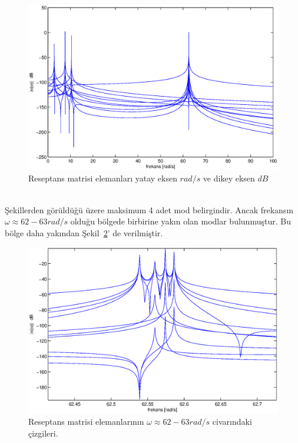 \documentclass[a4paper]{report}
\begin{document}
\begin{figure}[H]
\shorthandoff{=}
\centerline{
{\includegraphics[width=1.3\textwidth]{./reseptansdB.eps}}}
\caption[Reseptans matrisi elemanları]{Reseptans matrisi elemanları yatay eksen ${rad}/{s}$ ve dikey eksen $dB$ }
\label{fig:reseptansdb}
\end{figure}\clearpage~\\
Şekillerden görüldüğü üzere maksimum 4 adet mod belirgindir. Ancak frekansın $\omega\approx62-63 rad/s$ olduğu bölgede birbirine yakın olan modlar bulunmuştur. Bu bölge daha yakından Şekil~\ref{fig:reseptansdbz}' de verilmiştir.
\begin{figure}[H]
\shorthandoff{=}
\centerline{
{\includegraphics[width=1.3\textwidth]{./reseptansdBz.eps}}}
\caption[Reseptans matrisi elemanları]{Reseptans matrisi elemanlarının $\omega\approx62-63 rad/s$ civarındaki çizgileri. }
\label{fig:reseptansdbz}
\end{figure}
\end{document}
